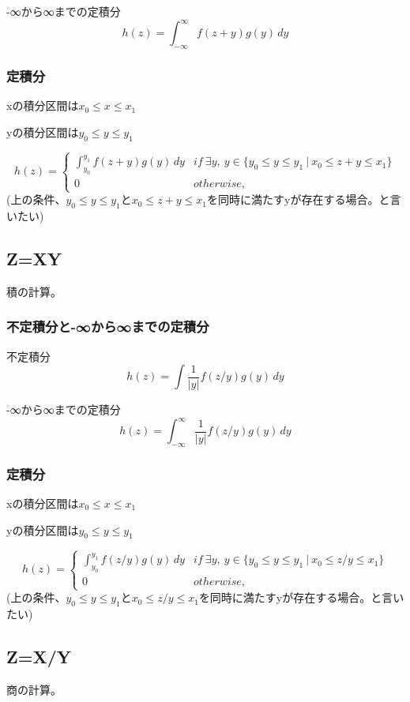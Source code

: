\documentclass[a4paper,11pt]{ltjsarticle}
\begin{document}
-∞から∞までの定積分
$$
    h(z) = \int_{-\infty}^{\infty} f(z+y) g(y)\,dy
$$
\subsubsection{定積分}
\begin{description}
    \item xの積分区間は$x_0 \leq x \leq x_1$
    \item yの積分区間は$y_0 \leq y \leq y_1$
\end{description}
$$
    h(z)=
    \begin{cases}
        \int_{y_0}^{y_1} f(z+y) g(y)\,dy   & if\ \exists y,\  y\in \{ y_0 \leq y \leq y_1 \ | \ x_0 \leq z+y \leq x_1 \}\\
        0                                   & otherwise,
    \end{cases}
$$
(上の条件、$y_0 \leq y \leq y_1$と$x_0 \leq z+y \leq x_1$を同時に満たすyが存在する場合。と言いたい)


\subsection{Z=XY}
積の計算。
\subsubsection{不定積分と-∞から∞までの定積分}
不定積分
$$
    h(z) = \int \frac{1}{|y|} f(z/y) g(y)\,dy
$$

-∞から∞までの定積分
$$
    h(z) = \int_{-\infty}^{\infty} \frac{1}{|y|} f(z/y) g(y)\,dy
$$
\subsubsection{定積分}
\begin{description}
    \item xの積分区間は$x_0 \leq x \leq x_1$
    \item yの積分区間は$y_0 \leq y \leq y_1$
\end{description}
$$
    h(z)=
    \begin{cases}
        \int_{y_0}^{y_1} f(z/y) g(y)\,dy   & if\ \exists y,\  y\in \{ y_0 \leq y \leq y_1 \ | \ x_0 \leq z/y \leq x_1 \}\\
        0                                   & otherwise,
    \end{cases}
$$
(上の条件、$y_0 \leq y \leq y_1$と$x_0 \leq z/y \leq x_1$を同時に満たすyが存在する場合。と言いたい)


\subsection{Z=X/Y}
商の計算。
\end{document}
